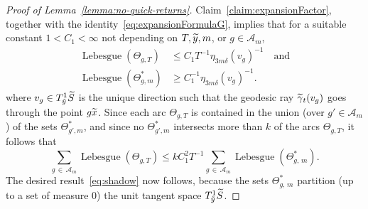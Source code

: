 \documentclass[AHL, Unicode, longabstracts, published]{cedram}
\DeclareMathOperator{\Lebesgue}{Lebesgue}
\let\oldtilde\tilde
\renewcommand*{\tilde}[1]{\mathchoice{\widetilde{#1}}{\widetilde{#1}}{\oldtilde{#1}}{\oldtilde{#1}}}\let\oldforall\forall
\renewcommand*{\forall}{\mathrel{\oldforall}}
\begin{document}
\begin{proof}[Proof of Lemma~\ref{lemma:no-quick-returns}]
Claim~\ref{claim:expansionFactor}, together with the identity~\eqref{eq:expansionFormulaG}, implies that for a suitable constant $1<C_{1}<\infty$ not depending on $T,\tilde{y},m$, or $g\in \mathcal{A}_{m}$,
\begin{align*}
\Lebesgue (\Theta_{g,T})&\leq C_{1} T^{-1}\eta_{3m \delta}(v_{g})^{-1} \quad\text{and}\\
\Lebesgue (\Theta^{*}_{g,m})&\geq C_{1}^{-1}\eta_{3m\delta}(v_{g})^{-1}.
\end{align*}
where $v_{g}\in T^{1}_{\tilde{y}}\tilde{S}$ is the unique direction such that the geodesic ray $\tilde{\gamma}_{t}(v_{g})$ goes through the point $g\tilde{x}$. Since each arc $\Theta_{g,T}$ is contained in the union (over $g' \in \mathcal{A}_{m}$) of the sets $\Theta^{*}_{g',m}$, and since no $\Theta^{*}_{g',m}$ intersects more than $k$ of the arcs $\Theta_{g,T}$, it follows that
\[
\sum_{g\,\in\,\mathcal{A}_{m}}\Lebesgue (\Theta_{g,T})\leq kC_{1}^{2} T^{-1} \sum_{g\,\in\,\mathcal{A}_{m}}\Lebesgue (\Theta^{*}_{g,\,m}).
\]
The desired result~\eqref{eq:shadow} now follows, because the sets $\Theta^{*}_{g,\,m}$ partition (up to a set of measure $0$) the unit tangent space $T^{1}_{\tilde{y}}\tilde{S}$.




\end{proof}
\end{document}
